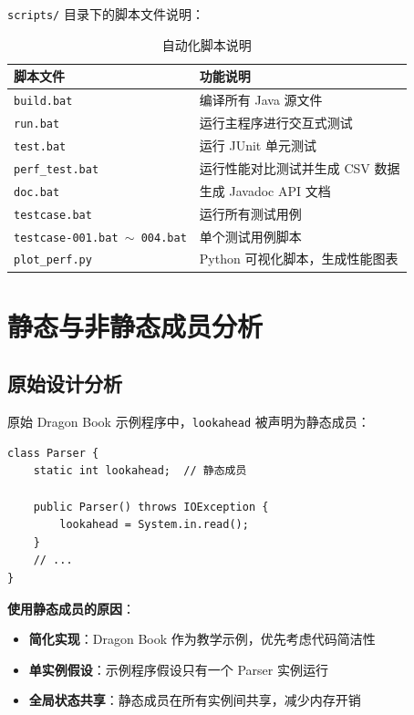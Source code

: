 \documentclass[a4paper]{article}
\begin{document}
\texttt{scripts/} 目录下的脚本文件说明：

\begin{table}[H]
\centering
\begin{tabular}{ll}
\toprule
\textbf{脚本文件} & \textbf{功能说明} \\
\midrule
\texttt{build.bat} & 编译所有 Java 源文件 \\
\texttt{run.bat} & 运行主程序进行交互式测试 \\
\texttt{test.bat} & 运行 JUnit 单元测试 \\
\texttt{perf\_test.bat} & 运行性能对比测试并生成 CSV 数据 \\
\texttt{doc.bat} & 生成 Javadoc API 文档 \\
\texttt{testcase.bat} & 运行所有测试用例 \\
\texttt{testcase-001.bat $\sim$ 004.bat} & 单个测试用例脚本 \\
\texttt{plot\_perf.py} & Python 可视化脚本，生成性能图表 \\
\bottomrule
\end{tabular}
\caption{自动化脚本说明}
\end{table}

\section{静态与非静态成员分析}

\subsection{原始设计分析}

原始 Dragon Book 示例程序中，\texttt{lookahead} 被声明为静态成员：

\begin{lstlisting}[caption={原始静态成员声明}]
class Parser {
    static int lookahead;  // 静态成员
    
    public Parser() throws IOException {
        lookahead = System.in.read();
    }
    // ...
}
\end{lstlisting}

\textbf{使用静态成员的原因}：
\begin{itemize}
    \item \textbf{简化实现}：Dragon Book 作为教学示例，优先考虑代码简洁性
    \item \textbf{单实例假设}：示例程序假设只有一个 Parser 实例运行
    \item \textbf{全局状态共享}：静态成员在所有实例间共享，减少内存开销
\end{itemize}
\end{document}
